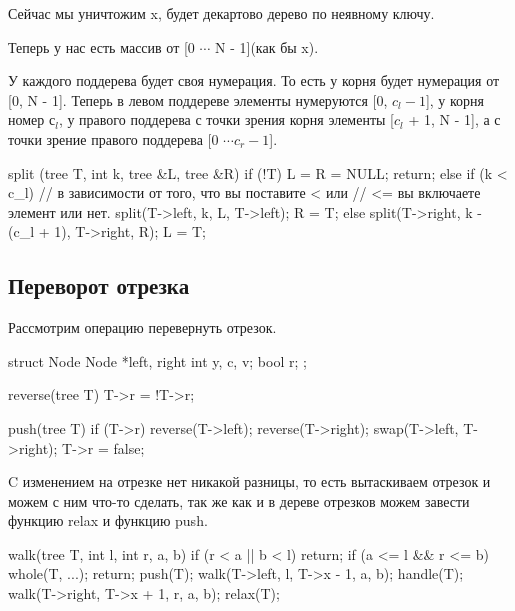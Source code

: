 Сейчас мы уничтожим x, будет декартово дерево по неявному ключу.

Теперь у нас есть массив от [0 $\cdots$ N - 1](как бы x).

У каждого поддерева будет своя нумерация. То есть у корня будет нумерация от [0, N - 1]. Теперь в
левом поддереве элементы нумеруются [0, $c_l - 1$], у корня номер $с_l$, у правого поддерева с точки зрения корня
элементы [$c_l$ + 1, N - 1], а с точки зрение правого поддерева [0 $\cdots c_r - 1$].

\begin{cppcode}
split (tree T, int k, tree &L, tree &R) {
    if (!T) {
        L = R = NULL;
        return;
    } else if (k < c_l) {  // в зависимости от того, что вы поставите < или 
    // <= вы включаете элемент или нет.
        split(T->left, k, L, T->left);
        R = T;
    } else {
        split(T->right, k - (c_l + 1), T->right, R);
        L = T;
    }
}
\end{cppcode} 

\subsection{Переворот отрезка}

Рассмотрим операцию перевернуть отрезок.

\begin{cppcode}
struct Node {
   Node *left, right
   int y, c, v;
   bool r;
};

reverse(tree T) {
    T->r = !T->r;
}

push(tree T) {
    if (T->r) {
        reverse(T->left);
        reverse(T->right);
        swap(T->left, T->right);
        T->r = false;
    }    
}
\end{cppcode}

C изменением на отрезке нет никакой разницы, то есть вытаскиваем отрезок и можем с ним что-то сделать, так 
же как и в дереве отрезков можем завести функцию relax и функцию push.

\begin{cppcode}
walk(tree T, int l, int r, a, b) {
    if (r < a || b < l) return;
    if (a <= l && r <= b) {
        whole(T, ...);
        return;
    }
    push(T);
    walk(T->left, l, T->x - 1, a, b);
    handle(T);
    walk(T->right, T->x + 1, r, a, b);
    relax(T);
}
\end{cppcode}

